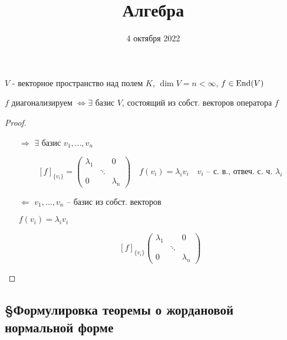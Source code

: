 


    \title{Алгебра}
    \date{4 октября 2022}
    \maketitle

    \pagebreak

    \begin{theorem*}
        $V$ - векторное пространство над полем $K$, $\dim V = n < \infty$, $f \in \operatorname{End}(V)$
        \par $f$ диагонализируем $\Leftrightarrow \exists$ базис $V$, состоящий из собст. векторов оператора $f$
    \end{theorem*}
    \begin{proof}
        $ $
        \begin{enumerate}
            \item[$\boxed{\Rightarrow}$] $\exists$ базис $v_1, \dots, v_n$
                \par \[
                    [f]_{\{v_i\}} = \begin{pmatrix}
                        \lambda_1 & & 0 \\
                        & \ddots & \\
                        0 & & \lambda_n
                    \end{pmatrix} \quad f(v_i) = \lambda_i v_i \quad v_i \text{ -- с. в., отвеч. с. ч. } \lambda_i
                \]
            \item[$\boxed{\Leftarrow}$] $v_1, \dots, v_n$ -- базис из собст. векторов
                \par $f(v_i) = \lambda_i v_i$
                \par \[
                    [f]_{\{v_i\}} \begin{pmatrix}
                        \lambda_1 & & 0 \\
                        & \ddots & \\
                        0 & & \lambda_n
                    \end{pmatrix}    
                \]
        \end{enumerate}
    \end{proof}

    \subsection*{\S Формулировка теоремы о жордановой нормальной форме}

